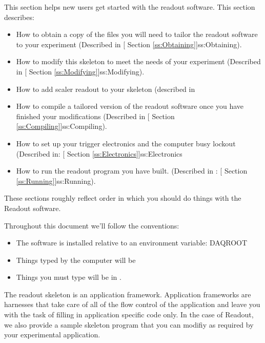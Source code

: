    This section helps new users get started with the
   readout software.  This section describes:
   \begin{itemize}
      \item How to obtain a copy of the files you will need
	    to tailor the readout software to your experiment
	    (Described in 
	    [
	       Section \ref{ss:Obtaining}]{ss:Obtaining}).
      \item How to modify this skeleton to meet the needs of
	    your experiment (Described in
	    [
	       Section \ref{ss:Modifying}]{ss:Modifying}).
      \item How to add scaler readout to your skeleton (described
	 in 
      \item How to compile a tailored version of the readout
	    software once you have finished your modifications
	    (Described in 
	    [
	       Section \ref{ss:Compiling}]{ss:Compiling}).
      \item How to set up your trigger electronics and 
	    the computer busy lockout (Described in:
	    [
	       Section \ref{ss:Electronics}]{ss:Electronics}
     \item How to run the readout program you have built.
	    (Described in :
	    [
	       Section \ref{ss:Running}]{ss:Running}).
 	    
   \end{itemize}

   These sections roughly reflect order in which you should
   do things with the Readout software.

   Throughout this document we'll follow the conventions:
   \begin{itemize}
      \item The software is installed relative to an
	 environment variable: DAQROOT
      \item Things typed by the computer will be 
      \item Things you must type will be in .
   \end{itemize}

   
   The readout skeleton is an application framework.  
   Application frameworks are harnesses that take care of all
   of the flow control of the application and leave you with 
   the task of filling in application specific code only.  
   In the case of Readout, we also provide a sample skeleton
   program that you can modifiy as required by your experimental
   application.
   
